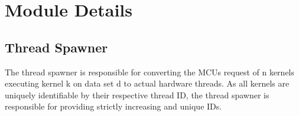 \documentclass[../main/report.tex]{subfiles}
\begin{document}
\section{Module Details}



\subsection{Thread Spawner}

The thread spawner is responsible for converting the MCUs request of n kernels executing kernel k on data set d to actual hardware threads.
As all kernels are uniquely identifiable by their respective thread ID, the thread spawner is responsible for providing strictly increasing and unique IDs.








\end{document}
